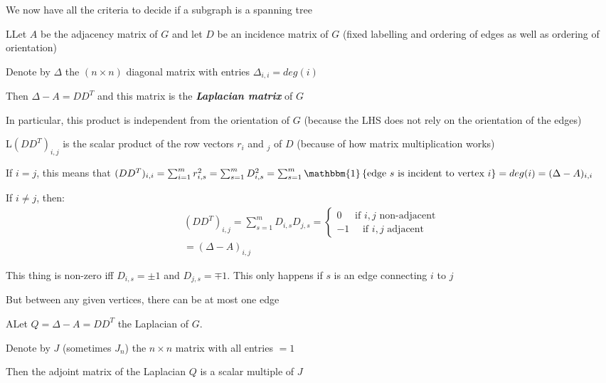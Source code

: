 \noindent We now have all the criteria to decide if a subgraph is a spanning tree
\par\bigskip
\begin{lem}
  LLet $A$ be the adjacency matrix of $G$ and let $D$ be an incidence matrix of $G$ (fixed labelling and ordering of edges as well as ordering of orientation)
  \par\bigskip
  \noindent Denote by $\Delta$ the $(n\times n)$ diagonal matrix with entries $\Delta_{i,i} = deg(i)$
  \par\bigskip
  \noindent Then $\Delta -A = DD^T$ and this matrix is the \textit{\textbf{Laplacian matrix}} of $G$
  \par\bigskip
  \noindent In particular, this product is independent from the orientation of $G$ (because the LHS does not rely on the orientation of the edges)
\end{lem}
\par\bigskip
\begin{prf}
  L$(DD^T)_{i,j}$ is the scalar product of the row vectors $r_i$ and $_j$ of $D$ (because of how matrix multiplication works)
  \par\bigskip
  \noindent If $i=j$, this means that $(DD^T)_{i,i} = \sum_{i=1}^{m}r_{i,s}^2 = \sum_{s=1}^{m}D_{i,s}^2 = \sum_{s=1}^{m}\mathbbm{1}\left\{\text{edge $s$ is incident to vertex $i$}\right\} = deg(i) = (\Delta-A)_{i,i}$
  \par\bigskip
  \noindent If $i\neq j$, then:
  \begin{equation*}
    \begin{gathered}
      (DD^T)_{i,j} = \sum_{s=1}^{m}D_{i,s}D_{j,s} = \begin{cases}0\quad\text{ if $i,j$ non-adjacent}\\-1\quad\text{ if $i,j$ adjacent}\end{cases}\\
       = (\Delta-A)_{i,j}
    \end{gathered}
  \end{equation*}
  \par\bigskip
  \noindent This thing is non-zero iff $D_{i,s} = \pm 1$ and $D_{j,s} = \mp 1$. This only happens if $s$ is an edge connecting $i$ to $j$\par
  \noindent But between any given vertices, there can be at most one edge
\end{prf}
\par\bigskip
\begin{lem}
  ALet $Q = \Delta -A = DD^T$ the Laplacian of $G$.\par
  \noindent Denote by $J$ (sometimes $J_n$) the $n\times n$ matrix with all entries $=1$
  \par\bigskip
  \noindent Then the adjoint matrix of the Laplacian $Q$ is a scalar multiple of $J$ 
\end{lem}
